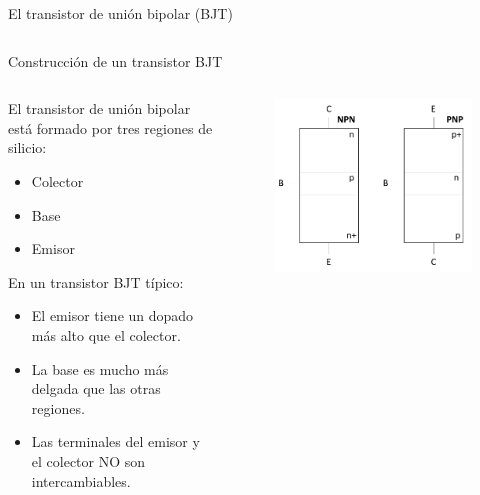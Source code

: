 \documentclass[t,aspectratio=169]{beamer}
\begin{document}
\begin{frame}{El transistor de unión bipolar (BJT)}
\begin{columns}
\begin{column}{0.5\textwidth}
\end{column}
\end{columns}

\end{frame}


\begin{frame}{Construcción de un transistor BJT}
\begin{columns}
\begin{column}{0.5\textwidth}

El transistor de unión bipolar está formado por tres regiones de silicio:

\begin{itemize}
    \item Colector
    \item Base
    \item Emisor
\end{itemize}

En un transistor BJT típico:

\begin{itemize}
    \item El emisor tiene un dopado más alto que el colector.
    \item La base es mucho más delgada que las otras regiones.
    \item Las terminales del emisor y el colector NO son intercambiables.
\end{itemize}

\end{column}
\begin{column}{0.5\textwidth}

    \begin{figure}
        \centering
        \includegraphics[width=\textwidth]{figures/construccion_transistor.png}
    \end{figure}

\end{column}
\end{columns}

\end{frame}
\end{document}

